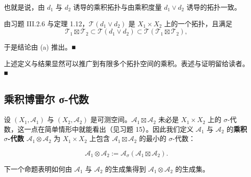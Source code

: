 \begin{remark}
\begin{items}
也就是说，由 $ d_1 $ 与 $ d_2 $ 诱导的乘积拓扑与由乘积度量 $ d_1 \vee d_2 $ 诱导的拓扑一致。

\proofhead
由习题 III.2.6 与定理 1.12，$ \mathcal{T}(d_1 \vee d_2) $ 是 $ X_1 \times X_2 $ 上的一个拓扑，且满足
\[
\mathcal{T}_1 \boxtimes \mathcal{T}_2 \subset \mathcal{T}(d_1 \vee d_2) \subset \mathcal{T}(\mathcal{T}_1 \boxtimes \mathcal{T}_2) ,
\]

于是结论由 (a) 推出。\nobreak\hspace{0.35em}■

\item

上述定义与结果显然可以推广到有限多个拓扑空间的乘积。表述与证明留给读者。\nobreak\hspace{0.35em}■

\end{items}

\end{remark}

\subsection*{乘积博雷尔 σ-代数}

设 $ (X_1, \mathcal{A}_1) $ 与 $ (X_2, \mathcal{A}_2) $ 是可测空间。$ \mathcal{A}_1 \boxtimes \mathcal{A}_2 $ 未必是 $ X_1 \times X_2 $ 上的 $ \sigma $-代数，这一点在简单情形中就能看出（见习题 15）。因此我们定义 $ \mathcal{A}_1 $ 与 $ \mathcal{A}_2 $ 的\textbf{乘积 $ \sigma $-代数 $ \mathcal{A}_1 \otimes \mathcal{A}_2 $} 为 $ X_1 \times X_2 $ 上包含 $ \mathcal{A}_1 \boxtimes \mathcal{A}_2 $ 的最小的 $ \sigma $-代数：

\[
\mathcal{A}_1 \otimes \mathcal{A}_2 := \mathcal{A}_\sigma(\mathcal{A}_1 \boxtimes \mathcal{A}_2) .
\]

下一个命题表明如何由 $ \mathcal{A}_1 $ 与 $ \mathcal{A}_2 $ 的生成集得到 $ \mathcal{A}_1 \otimes \mathcal{A}_2 $ 的生成集。

